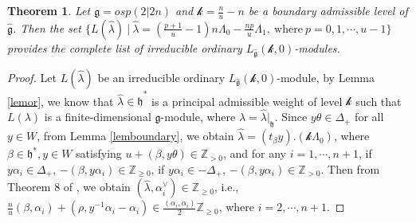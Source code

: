 \documentclass[12pt]{article}
\newtheorem{thm}{Theorem}[section]
\begin{document}
\begin{thm}
Let $\mathfrak{g}=osp(2|2n)$ and
$\mathcal{k}=\frac{n}{u}-n$ be a boundary admissible level of $\widehat{\mathfrak{g}}$.
Then the set $\{L(\hat{\lambda})~|~\hat{\lambda}=(\frac{p+1}{u}-1)n\Lambda_0-\frac{np}{u}\Lambda_1,~\mbox{where}~p=0,1,\cdots,u-1\}$
provides the complete list of irreducible ordinary $L_{\widehat{\mathfrak{g}}}(\mathcal{k},0)$-modules.
\end{thm}
\begin{proof}
Let $L(\hat{\lambda})$ be an irreducible ordinary $L_{\widehat{\mathfrak{g}}}(\mathcal{k},0)$-module,
by Lemma \ref{lemor}, we know that $\hat{\lambda}\in \widehat{\mathfrak{h}}^*$ is a principal admissible weight of level $\mathcal{k}$ such that $L(\lambda)$
is a finite-dimensional $\mathfrak{g}$-module, where $\lambda=\hat{\lambda}|_{\mathfrak{h}}$.
Since $y\theta\in \Delta_+$ for all $y\in W$, from Lemma \ref{lemboundary}, we obtain $\hat{\lambda}=(t_\beta y).(\mathcal{k}\Lambda_0)$,
where $\beta\in \mathfrak{h}^*, y\in W$ satisfying
$u+(\beta,y\theta)\in\mathbb{Z}_{>0}$,
and for any $i=1,\cdots,n+1$,
if $y\alpha_i\in \Delta_+$, $-(\beta,y\alpha_i)\in\mathbb{Z}_{\geq0}$,
if $y\alpha_i\in -\Delta_+$, $-(\beta,y\alpha_i)\in\mathbb{Z}_{>0}$.
Then from Theorem 8 of \cite{Kac77}, we obtain $(\hat{\lambda}, \alpha_i^\vee)\in \mathbb{Z}_{\geq0}$,
i.e., $\frac{n}{u}(\beta,\alpha_i)+(\rho,y^{-1}\alpha_i-\alpha_i)\in \frac{(\alpha_i,\alpha_i)}{2}\mathbb{Z}_{\geq0}$,
where $i=2,\cdots,n+1$.


\end{proof}
\end{document}
